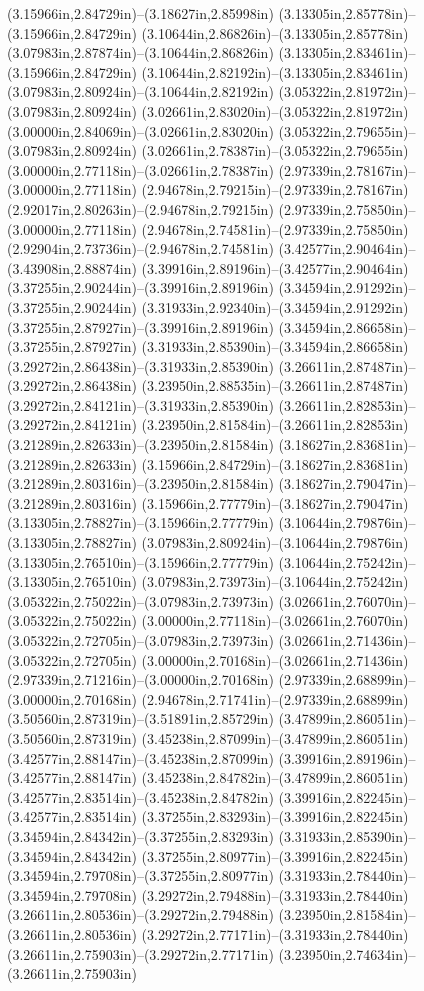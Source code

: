 (3.15966in,2.84729in)--(3.18627in,2.85998in) (3.13305in,2.85778in)--(3.15966in,2.84729in) (3.10644in,2.86826in)--(3.13305in,2.85778in) (3.07983in,2.87874in)--(3.10644in,2.86826in) (3.13305in,2.83461in)--(3.15966in,2.84729in) (3.10644in,2.82192in)--(3.13305in,2.83461in) (3.07983in,2.80924in)--(3.10644in,2.82192in) (3.05322in,2.81972in)--(3.07983in,2.80924in) (3.02661in,2.83020in)--(3.05322in,2.81972in) (3.00000in,2.84069in)--(3.02661in,2.83020in) (3.05322in,2.79655in)--(3.07983in,2.80924in) (3.02661in,2.78387in)--(3.05322in,2.79655in) (3.00000in,2.77118in)--(3.02661in,2.78387in) (2.97339in,2.78167in)--(3.00000in,2.77118in) (2.94678in,2.79215in)--(2.97339in,2.78167in) (2.92017in,2.80263in)--(2.94678in,2.79215in) (2.97339in,2.75850in)--(3.00000in,2.77118in) (2.94678in,2.74581in)--(2.97339in,2.75850in) (2.92904in,2.73736in)--(2.94678in,2.74581in) (3.42577in,2.90464in)--(3.43908in,2.88874in) (3.39916in,2.89196in)--(3.42577in,2.90464in) (3.37255in,2.90244in)--(3.39916in,2.89196in) (3.34594in,2.91292in)--(3.37255in,2.90244in) (3.31933in,2.92340in)--(3.34594in,2.91292in) (3.37255in,2.87927in)--(3.39916in,2.89196in) (3.34594in,2.86658in)--(3.37255in,2.87927in) (3.31933in,2.85390in)--(3.34594in,2.86658in) (3.29272in,2.86438in)--(3.31933in,2.85390in) (3.26611in,2.87487in)--(3.29272in,2.86438in) (3.23950in,2.88535in)--(3.26611in,2.87487in) (3.29272in,2.84121in)--(3.31933in,2.85390in) (3.26611in,2.82853in)--(3.29272in,2.84121in) (3.23950in,2.81584in)--(3.26611in,2.82853in) (3.21289in,2.82633in)--(3.23950in,2.81584in) (3.18627in,2.83681in)--(3.21289in,2.82633in) (3.15966in,2.84729in)--(3.18627in,2.83681in) (3.21289in,2.80316in)--(3.23950in,2.81584in) (3.18627in,2.79047in)--(3.21289in,2.80316in) (3.15966in,2.77779in)--(3.18627in,2.79047in) (3.13305in,2.78827in)--(3.15966in,2.77779in) (3.10644in,2.79876in)--(3.13305in,2.78827in) (3.07983in,2.80924in)--(3.10644in,2.79876in) (3.13305in,2.76510in)--(3.15966in,2.77779in) (3.10644in,2.75242in)--(3.13305in,2.76510in) (3.07983in,2.73973in)--(3.10644in,2.75242in) (3.05322in,2.75022in)--(3.07983in,2.73973in) (3.02661in,2.76070in)--(3.05322in,2.75022in) (3.00000in,2.77118in)--(3.02661in,2.76070in) (3.05322in,2.72705in)--(3.07983in,2.73973in) (3.02661in,2.71436in)--(3.05322in,2.72705in) (3.00000in,2.70168in)--(3.02661in,2.71436in) (2.97339in,2.71216in)--(3.00000in,2.70168in) (2.97339in,2.68899in)--(3.00000in,2.70168in) (2.94678in,2.71741in)--(2.97339in,2.68899in) (3.50560in,2.87319in)--(3.51891in,2.85729in) (3.47899in,2.86051in)--(3.50560in,2.87319in) (3.45238in,2.87099in)--(3.47899in,2.86051in) (3.42577in,2.88147in)--(3.45238in,2.87099in) (3.39916in,2.89196in)--(3.42577in,2.88147in) (3.45238in,2.84782in)--(3.47899in,2.86051in) (3.42577in,2.83514in)--(3.45238in,2.84782in) (3.39916in,2.82245in)--(3.42577in,2.83514in) (3.37255in,2.83293in)--(3.39916in,2.82245in) (3.34594in,2.84342in)--(3.37255in,2.83293in) (3.31933in,2.85390in)--(3.34594in,2.84342in) (3.37255in,2.80977in)--(3.39916in,2.82245in) (3.34594in,2.79708in)--(3.37255in,2.80977in) (3.31933in,2.78440in)--(3.34594in,2.79708in) (3.29272in,2.79488in)--(3.31933in,2.78440in) (3.26611in,2.80536in)--(3.29272in,2.79488in) (3.23950in,2.81584in)--(3.26611in,2.80536in) (3.29272in,2.77171in)--(3.31933in,2.78440in) (3.26611in,2.75903in)--(3.29272in,2.77171in) (3.23950in,2.74634in)--(3.26611in,2.75903in) 
